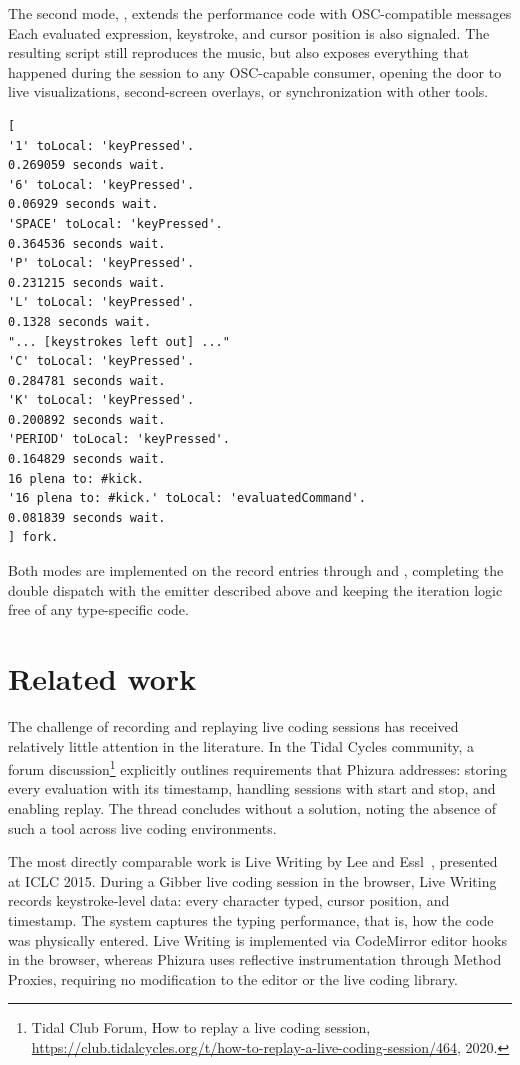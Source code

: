 \documentclass[
]{ceurart}
\begin{document}
The second mode, , extends the performance code with OSC-compatible messages
Each evaluated expression, keystroke, and cursor position is also signaled.
The resulting script still reproduces the music, but also exposes everything that happened during the session to any OSC-capable consumer, opening the door to live visualizations, second-screen overlays, or synchronization with other tools.

\begin{lstlisting}[label={lst:emitted-mooflod},caption={Example of emitted MoofLOD code (middle elided)}]
[
'1' toLocal: 'keyPressed'.
0.269059 seconds wait.
'6' toLocal: 'keyPressed'.
0.06929 seconds wait.
'SPACE' toLocal: 'keyPressed'.
0.364536 seconds wait.
'P' toLocal: 'keyPressed'.
0.231215 seconds wait.
'L' toLocal: 'keyPressed'.
0.1328 seconds wait.
"... [keystrokes left out] ..."
'C' toLocal: 'keyPressed'.
0.284781 seconds wait.
'K' toLocal: 'keyPressed'.
0.200892 seconds wait.
'PERIOD' toLocal: 'keyPressed'.
0.164829 seconds wait.
16 plena to: #kick.
'16 plena to: #kick.' toLocal: 'evaluatedCommand'.
0.081839 seconds wait.
] fork.
\end{lstlisting}

Both modes are implemented on the record entries through  and , completing the double dispatch with the emitter described above and keeping the iteration logic free of any type-specific code.

\section{Related work}

The challenge of recording and replaying live coding sessions has received relatively little attention in the literature. In the Tidal Cycles community, a forum discussion\footnote{Tidal Club Forum, How to replay a live coding session, \url{https://club.tidalcycles.org/t/how-to-replay-a-live-coding-session/464}, 2020.} explicitly outlines requirements that Phizura addresses: storing every evaluation with its timestamp, handling sessions with start and stop, and enabling replay. The thread concludes without a solution, noting the absence of such a tool across live coding environments.

The most directly comparable work is Live Writing by Lee and Essl~\cite{Lee15a}, presented at ICLC 2015. During a Gibber live coding session in the browser, Live Writing records keystroke-level data: every character typed, cursor position, and timestamp. The system captures the typing performance, that is, how the code was physically entered. Live Writing is implemented via CodeMirror editor hooks in the browser, whereas Phizura uses reflective instrumentation through Method Proxies, requiring no modification to the editor or the live coding library.
\end{document}
